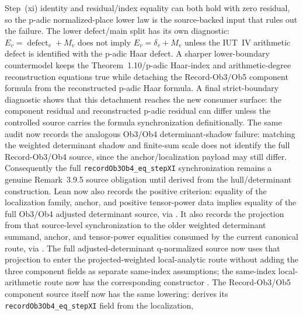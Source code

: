 \documentclass[11pt]{article}
\theoremstyle{plain}
\theoremstyle{definition}
\theoremstyle{remark}
\begin{document}
Step~(xi) identity and residual/index equality can both hold with zero
residual, so the p-adic normalized-place lower law is the source-backed input
that rules out the failure.
The lower defect/main split has its own diagnostic: \(E_v=\operatorname{defect}_v+M_v\)
does not imply \(E_v=\delta_v+M_v\) unless the IUT~IV arithmetic defect is
identified with the p-adic Haar defect.
A sharper lower-boundary countermodel keeps the Theorem~1.10/p-adic Haar-index
and arithmetic-degree reconstruction equations true while detaching the
Record-Ob3/Ob5 component formula from the reconstructed p-adic Haar formula.
A final strict-boundary diagnostic shows that this detachment reaches the new
consumer surface: the component residual and reconstructed p-adic residual can
differ unless the controlled source carries the formula synchronization
definitionally.
The same audit now records the analogous Ob3/Ob4 determinant-shadow failure:
matching the weighted determinant shadow and finite-sum scale does not identify
the full Record-Ob3/Ob4 source, since the anchor/localization payload may still
differ.  Consequently the full \texttt{recordOb3Ob4\_eq\_stepXI}
synchronization remains a genuine Remark~3.9.5 source obligation until derived
from the hull/determinant construction.  Lean now also records the positive
criterion: equality of the localization family, anchor, and positive
tensor-power data implies equality of the full Ob3/Ob4 adjusted determinant
source, via
\texttt{}.
It also records the projection from that source-level synchronization to the
older weighted determinant summand, anchor, and tensor-power equalities consumed
by the current canonical route, via
\texttt{}.
The full adjusted-determinant q-normalized source now uses that projection to
enter the projected-weighted local-analytic route without adding the three
component fields as separate same-index assumptions; the same-index
local-arithmetic route now has the corresponding constructor
\texttt{}.
The Record-Ob3/Ob5 component source itself now has the same lowering:
\texttt{}
derives its \texttt{recordOb3Ob4\_eq\_stepXI} field from the localization,
\end{document}
